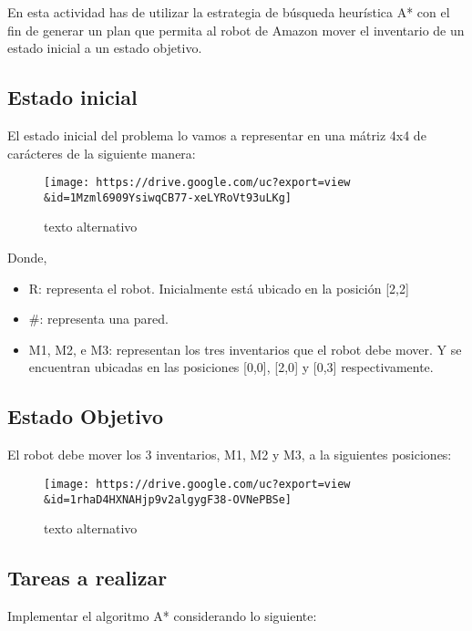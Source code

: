 \documentclass[11pt]{article}
\providecommand{\tightlist}{%
      \setlength{\itemsep}{0pt}\setlength{\parskip}{0pt}}
\begin{document}
    En esta actividad has de utilizar la estrategia de búsqueda heurística
A* con el fin de generar un plan que permita al robot de Amazon mover el
inventario de un estado inicial a un estado objetivo.

    \hypertarget{estado-inicial}{%
\subsection{Estado inicial}\label{estado-inicial}}

El estado inicial del problema lo vamos a representar en una mátriz 4x4
de carácteres de la siguiente manera:

\begin{figure}
\centering
\texttt{[image: https://drive.google.com/uc?export=view\\\&id=1Mzml6909YsiwqCB77-xeLYRoVt93uLKg]}
\caption{texto alternativo}
\end{figure}

Donde,

\begin{itemize}
\tightlist
\item
  R: representa el robot. Inicialmente está ubicado en la posición
  {[}2,2{]}
\item
  \#: representa una pared.
\item
  M1, M2, e M3: representan los tres inventarios que el robot debe
  mover. Y se encuentran ubicadas en las posiciones {[}0,0{]}, {[}2,0{]}
  y {[}0,3{]} respectivamente.
\end{itemize}

\hypertarget{estado-objetivo}{%
\subsection{Estado Objetivo}\label{estado-objetivo}}

El robot debe mover los 3 inventarios, M1, M2 y M3, a la siguientes
posiciones:

\begin{figure}
\centering
\texttt{[image: https://drive.google.com/uc?export=view\\\&id=1rhaD4HXNAHjp9v2algygF38-OVNePBSe]}
\caption{texto alternativo}
\end{figure}

    \hypertarget{tareas-a-realizar}{%
\subsection{Tareas a realizar}\label{tareas-a-realizar}}

Implementar el algoritmo A* considerando lo siguiente:
\end{document}
